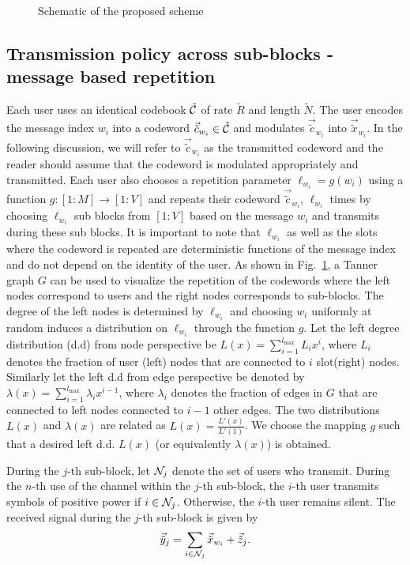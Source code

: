 \begin{figure}[h]
  \centering
  \resizebox{0.9\textwidth}{!}{}
  \caption{Schematic of the proposed scheme}
  \label{fig:overallscheme}
\end{figure}

\subsection{Transmission policy across sub-blocks - message based repetition}
\label{sec:Txpolicy_TannerGraph}
Each user uses an identical codebook $\tilde{\mathcal{C}}$ of rate $\tilde{R}$ and length $\tilde{N}$. The user encodes the message index $w_i$ into a codeword $\vec{\tilde{c}}_{w_i} \in \tilde{\mathcal{C}}$ and modulates $\vec{\tilde{c}}_{w_i}$ into $\vec{\tilde{x}}_{w_i}$. In the following discussion, we will refer to $\vec{\tilde{c}}_{w_i}$ as the transmitted codeword and the reader should assume that the codeword is modulated appropriately and transmitted. Each user also chooses a repetition parameter $\ell_{w_i}=g(w_i)$ using a function $g:[1:M] \rightarrow [1:V]$ and repeats their codeword $\vec{\tilde{c}}_{w_i}$, $\ell_{w_i}$ times by choosing $\ell_{w_i}$ sub blocks from $[1:V]$ based on the message $w_i$ and transmits during these sub blocks. It is important to note that $\ell_{w_i}$ as well as the slots where the codeword is repeated are deterministic functions of the message index and do not depend on the identity of the user. As shown in Fig.~\ref{fig:overallscheme}, a Tanner graph $G$ can be used to visualize the repetition of the codewords where the left nodes correspond to users and the right nodes corresponds to sub-blocks. The degree of the left nodes is determined by $\ell_{w_i}$ and choosing $w_i$ uniformly at random induces a distribution on $\ell_{w_i}$ through the function $g$.  Let the left degree distribution (d.d) from node perspective be $L(x) = \sum_{{i=1}}^{{l_{\max}}} L_i x^i$, where $L_i$ denotes the fraction of user (left) nodes that are connected to $i$ slot(right) nodes. Similarly let the left d.d from edge perspective be denoted by $\lambda(x) = \sum_{{i=1}}^{{l_{\max}}} \lambda_i x^{i-1}$, where $\lambda_i$ denotes the fraction of edges in $G$ that are connected to left nodes connected to $i-1$ other edges. The two distributions $L(x)$ and $\lambda(x)$ are related as $L(x)=\frac{L'(x)}{L'(1)}$. We choose the mapping $g$ such that a desired left d.d. $L(x)$ (or equivalently $\lambda(x)$) is obtained.

During the $j$-th sub-block, let $\mathcal{N}_j$ denote the set of users who transmit. During the $n$-th use of the channel within the $j$-th sub-block, the $i$-th user transmits  symbols of positive power if $i \in \mathcal{N}_j$. Otherwise, the $i$-th user remains silent. The received signal during the $j$-th sub-block is given by
\begin{equation}
\vec{\tilde{y}}_j = \sum_{i\in \mathcal{N}_j} \vec{\tilde{x}}_{w_i} + \vec{\tilde{z}}_j.
\end{equation}

